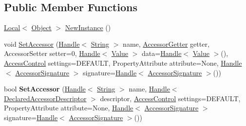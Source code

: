 \subsection*{Public Member Functions}
\begin{DoxyCompactItemize}
\item 
\hyperlink{classv8_1_1_local}{Local}$<$ \hyperlink{classv8_1_1_object}{Object} $>$ \hyperlink{classv8_1_1_object_template_ad25d8ebf37b1a3aaf7d4a03b1a9bd5c1}{New\+Instance} ()
\item 
void \hyperlink{classv8_1_1_object_template_a912ade2f7db7c7e30b606d10012c2bac}{Set\+Accessor} (\hyperlink{classv8_1_1_handle}{Handle}$<$ \hyperlink{classv8_1_1_string}{String} $>$ name, \hyperlink{namespacev8_a3016fe071826349d1370a700e71be094}{Accessor\+Getter} getter, Accessor\+Setter setter=0, \hyperlink{classv8_1_1_handle}{Handle}$<$ \hyperlink{classv8_1_1_value}{Value} $>$ data=\hyperlink{classv8_1_1_handle}{Handle}$<$ \hyperlink{classv8_1_1_value}{Value} $>$(), \hyperlink{namespacev8_a31d8355cb043d7d2dda3f4a52760b64e}{Access\+Control} settings=D\+E\+F\+A\+U\+L\+T, Property\+Attribute attribute=None, \hyperlink{classv8_1_1_handle}{Handle}$<$ \hyperlink{classv8_1_1_accessor_signature}{Accessor\+Signature} $>$ signature=\hyperlink{classv8_1_1_handle}{Handle}$<$ \hyperlink{classv8_1_1_accessor_signature}{Accessor\+Signature} $>$())
\item 
\hypertarget{classv8_1_1_object_template_a6d0f431e75ea6d192588da4cb7ffd6c6}{}bool {\bfseries Set\+Accessor} (\hyperlink{classv8_1_1_handle}{Handle}$<$ \hyperlink{classv8_1_1_string}{String} $>$ name, \hyperlink{classv8_1_1_handle}{Handle}$<$ \hyperlink{classv8_1_1_declared_accessor_descriptor}{Declared\+Accessor\+Descriptor} $>$ descriptor, \hyperlink{namespacev8_a31d8355cb043d7d2dda3f4a52760b64e}{Access\+Control} settings=D\+E\+F\+A\+U\+L\+T, Property\+Attribute attribute=None, \hyperlink{classv8_1_1_handle}{Handle}$<$ \hyperlink{classv8_1_1_accessor_signature}{Accessor\+Signature} $>$ signature=\hyperlink{classv8_1_1_handle}{Handle}$<$ \hyperlink{classv8_1_1_accessor_signature}{Accessor\+Signature} $>$())\label{classv8_1_1_object_template_a6d0f431e75ea6d192588da4cb7ffd6c6}


\end{DoxyCompactItemize}
